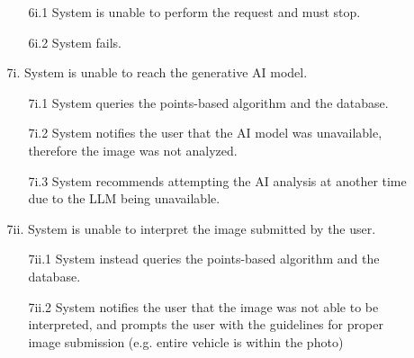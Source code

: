 \documentclass[]{article}
\begin{document}
\begin{enumerate}[{\bf {BE}1.}]
\begin{enumerate}
\begin{enumerate}
    			\item [6i.1] System is unable to perform the request and must stop.
    			\item [6i.2] System fails.
    		\end{enumerate}
    		\item [7i.] System is unable to reach the generative AI model.
    		\begin{enumerate}[{7i}.1]
    			\item [7i.1] System queries the points-based algorithm and the database.
    			\item [7i.2] System notifies the user that the AI model was unavailable, therefore the image was not analyzed.
    			\item [7i.3] System recommends attempting the AI analysis at another time due to the LLM being unavailable. 
    		\end{enumerate}
    		\item [7ii.] System is unable to interpret the image submitted by the user.
    		\begin{enumerate}
    			\item [7ii.1] System instead queries the points-based algorithm and the database.
    			\item [7ii.2] System notifies the user that the image was not able to be interpreted, and prompts the user with the guidelines for proper image submission (e.g. entire vehicle is within the photo)
    		\end{enumerate}
            \end{enumerate}


\end{enumerate}
\end{document}
